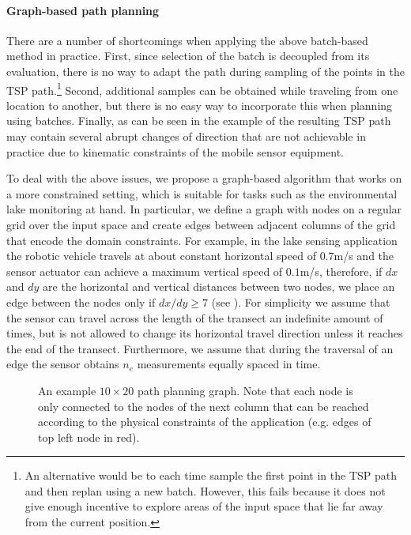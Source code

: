 \paragraph{Graph-based path planning}
There are a number of shortcomings when applying the above batch-based method
in practice. First, since selection of the batch is decoupled from its
evaluation, there is no way to adapt the path during sampling of the points
in the TSP path.\footnote{An alternative would be to each time sample the first
point in the TSP path and then replan using a new batch. However, this fails
because it does not give enough incentive to explore areas of the input space
that lie far away from the current position.} Second, additional samples can be obtained while traveling from one location
to another, but there is no easy way to incorporate this when planning using
batches.
Finally, as can be seen in the example of 
the resulting TSP path may contain several abrupt changes of direction that
are not achievable in practice due to kinematic constraints of the mobile
sensor equipment.

To deal with the above issues, we propose a graph-based algorithm that works
on a more constrained setting, which is suitable for tasks such as the
environmental lake monitoring at hand. In particular, we define a graph with
nodes on a regular grid over the input space and create edges between
adjacent columns of the grid that encode the domain constraints. For example,
in the lake sensing application the robotic vehicle travels at about constant
horizontal speed of $0.7$m/s and the sensor actuator can achieve a maximum
vertical speed of
$0.1$m/s, therefore, if $dx$ and $dy$ are the horizontal and vertical
distances between two nodes, we place an edge between the nodes only if
$dx/dy \geq 7$ (see ).
For simplicity we assume that the sensor can travel across the length
of the transect an indefinite amount of times, but is not allowed to
change its horizontal travel direction unless it reaches the end of the
transect.
Furthermore, we assume that during the traversal of an edge the sensor
obtains $n_e$ measurements equally spaced in time.

%
\begin{figure}[tb]
  \centering
  \caption{An example $10\times 20$ path planning graph. Note that each node
           is only connected to the nodes of the next column that can be
           reached according to the physical constraints of the application
           (e.g. edges of top left node in red).}
  \label{fig:graph}
\end{figure}

